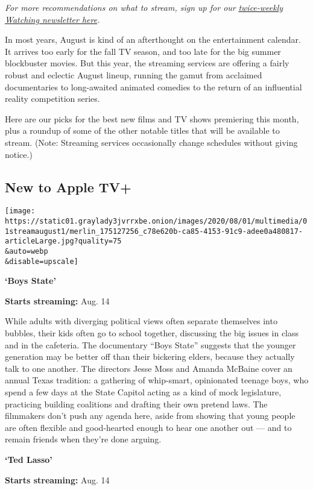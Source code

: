 \emph{For more recommendations on what to stream, sign up for our}
\href{https://www.nytimes3xbfgragh.onion/newsletters/watching}{\emph{twice-weekly
Watching newsletter here}}\emph{.}

In most years, August is kind of an afterthought on the entertainment
calendar. It arrives too early for the fall TV season, and too late for
the big summer blockbuster movies. But this year, the streaming services
are offering a fairly robust and eclectic August lineup, running the
gamut from acclaimed documentaries to long-awaited animated comedies to
the return of an influential reality competition series.

Here are our picks for the best new films and TV shows premiering this
month, plus a roundup of some of the other notable titles that will be
available to stream. (Note: Streaming services occasionally change
schedules without giving notice.)

\hypertarget{new-to-apple-tv}{%
\subsection{New to Apple TV+}\label{new-to-apple-tv}}

\texttt{[image: https://static01.graylady3jvrrxbe.onion/images/2020/08/01/multimedia/01streamaugust1/merlin\_175127256\_c78e620b-ca85-4153-91c9-adee0a480817-articleLarge.jpg?quality=75\\\&auto=webp\\\&disable=upscale]}

\textbf{`Boys State'}

\textbf{Starts streaming:} Aug. 14

While adults with diverging political views often separate themselves
into bubbles, their kids often go to school together, discussing the big
issues in class and in the cafeteria. The documentary ``Boys State''
suggests that the younger generation may be better off than their
bickering elders, because they actually talk to one another. The
directors Jesse Moss and Amanda McBaine cover an annual Texas tradition:
a gathering of whip-smart, opinionated teenage boys, who spend a few
days at the State Capitol acting as a kind of mock legislature,
practicing building coalitions and drafting their own pretend laws. The
filmmakers don't push any agenda here, aside from showing that young
people are often flexible and good-hearted enough to hear one another
out --- and to remain friends when they're done arguing.

\textbf{`Ted Lasso'}

\textbf{Starts streaming:} Aug. 14

